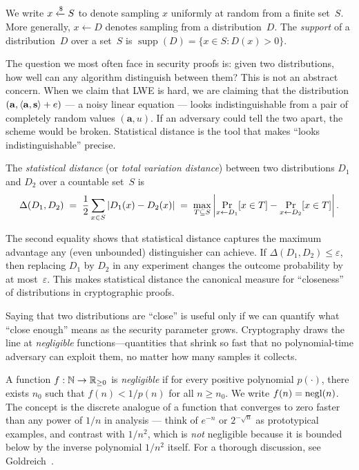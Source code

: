 We write $x \getsr S$ to denote sampling $x$ uniformly at random from a finite set~$S$.  More generally, $x \gets D$ denotes sampling from a distribution~$D$.  The \emph{support} of a distribution~$D$ over a set~$S$ is $\operatorname{supp}(D) = \{x \in S : D(x) > 0\}$.

The question we most often face in security proofs is: given two distributions, how well can any algorithm distinguish between them?  This is not an abstract concern.  When we claim that LWE is hard, we are claiming that the distribution $(\mathbf{a}, \left\langle \mathbf{a}, \mathbf{s} \right\rangle + e)$ --- a noisy linear equation --- looks indistinguishable from a pair of completely random values $(\mathbf{a}, u)$.  If an adversary could tell the two apart, the scheme would be broken.  Statistical distance is the tool that makes ``looks indistinguishable'' precise.

\begin{definition}
\label{def:stat-dist}
The \emph{statistical distance} (or \emph{total variation distance}) between two distributions $D_1$ and $D_2$ over a countable set~$S$ is
\begin{equation}
\label{eq:stat-dist}
\Delta(D_1, D_2) \;=\; \frac{1}{2} \sum_{x \in S} \left\lvert D_1(x) - D_2(x) \right\rvert \;=\; \max_{T \subseteq S} \left\lvert \Pr_{x \gets D_1}[x \in T] - \Pr_{x \gets D_2}[x \in T] \right\rvert.
\end{equation}
\end{definition}

The second equality shows that statistical distance captures the maximum advantage any (even unbounded) distinguisher can achieve.  If $\Delta(D_1, D_2) \leq \varepsilon$, then replacing $D_1$ by $D_2$ in any experiment changes the outcome probability by at most~$\varepsilon$.  This makes statistical distance the canonical measure for ``closeness'' of distributions in cryptographic proofs.

Saying that two distributions are ``close'' is useful only if we can quantify what ``close enough'' means as the security parameter grows.  Cryptography draws the line at \emph{negligible} functions---quantities that shrink so fast that no polynomial-time adversary can exploit them, no matter how many samples it collects.

\begin{definition}
\label{def:negl}
A function $f : \mathbb{N} \to \mathbb{R}_{\geq 0}$ is \emph{negligible} if for every positive polynomial $p(\cdot)$, there exists $n_0$ such that $f(n) < 1/p(n)$ for all $n \geq n_0$.  We write $f(n) = \operatorname{negl}(n)$.  The concept is the discrete analogue of a function that converges to zero faster than any power of $1/n$ in analysis --- think of $e^{-n}$ or $2^{-\sqrt{n}}$ as prototypical examples, and contrast with $1/n^2$, which is \emph{not} negligible because it is bounded below by the inverse polynomial $1/n^2$ itself.  For a thorough discussion, see Goldreich~\cite{Goldreich2001}.
\end{definition}

